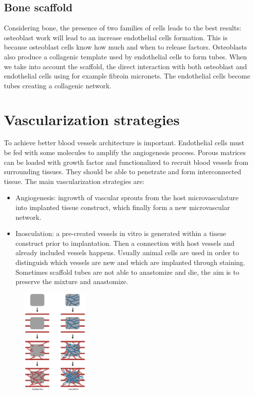 	\subsection{Bone scaffold}
	Considering bone, the presence of two families of cells leads to the best results: osteoblast work will lead to an increase endothelial cells formation.
	This is because osteoblast cells know how much and when to release factors.
	Osteoblasts also produce a collagenic template used by endothelial cells to form tubes.
	When we take into account the scaffold, the direct interaction with both osteoblast and endothelial cells using for example fibroin micronets.
	The endothelial cells become tubes creating a collagenic network.

\section{Vascularization strategies}
To achieve better blood vessels architecture is important.
Endothelial cells must be fed with some molecules to amplify the angiogenesis process.
Porous matrices can be loaded with growth factor and functionalized to recruit blood vessels from surrounding tissues.
They should be able to penetrate and form interconnected tissue.
The main vascularization strategies are:

\begin{multicols}{2}
	\begin{itemize}
		\item Angiogenesis: ingrowth of vascular sprouts from the host microvasculature into implanted tissue construct, which finally form a new microvascular network.
		\item Inosculation: a pre-created vessels in vitro is generated within a tissue construct prior to implantation.
			Then a connection with host vessels and already included vessels happens.
			Usually animal cells are used in order to distinguish which vessels are new and which are implanted through staining.
			Sometimes scaffold tubes are not able to anastomize and die, the aim is to preserve the mixture and anastomize.
	\end{itemize}
\end{multicols}

\begin{figure}[h]
\centering
\includegraphics[width=0.3\textwidth]{vasc}
\caption{\label{fig:vasc}}
\end{figure}


